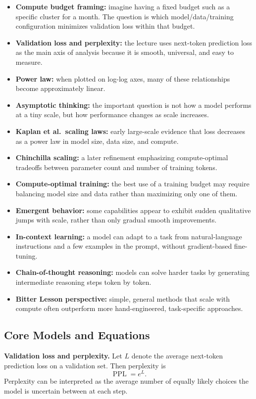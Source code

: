 \documentclass[11pt]{article}
\begin{document}
\begin{itemize}
    \item \textbf{Compute budget framing:} imagine having a fixed budget such as a specific cluster for a month. The question is which model/data/training configuration minimizes validation loss within that budget.
    \item \textbf{Validation loss and perplexity:} the lecture uses next-token prediction loss as the main axis of analysis because it is smooth, universal, and easy to measure.
    \item \textbf{Power law:} when plotted on log-log axes, many of these relationships become approximately linear.
    \item \textbf{Asymptotic thinking:} the important question is not how a model performs at a tiny scale, but how performance changes as scale increases.
    \item \textbf{Kaplan et al.\ scaling laws:} early large-scale evidence that loss decreases as a power law in model size, data size, and compute.
    \item \textbf{Chinchilla scaling:} a later refinement emphasizing compute-optimal tradeoffs between parameter count and number of training tokens.
    \item \textbf{Compute-optimal training:} the best use of a training budget may require balancing model size and data rather than maximizing only one of them.
    \item \textbf{Emergent behavior:} some capabilities appear to exhibit sudden qualitative jumps with scale, rather than only gradual smooth improvements.
    \item \textbf{In-context learning:} a model can adapt to a task from natural-language instructions and a few examples in the prompt, without gradient-based fine-tuning.
    \item \textbf{Chain-of-thought reasoning:} models can solve harder tasks by generating intermediate reasoning steps token by token.
    \item \textbf{Bitter Lesson perspective:} simple, general methods that scale with compute often outperform more hand-engineered, task-specific approaches.
\end{itemize}

\subsection{Core Models and Equations}
\textbf{Validation loss and perplexity.} Let \(L\) denote the average next-token prediction loss on a validation set. Then perplexity is
\[
\operatorname{PPL} = e^{L}.
\]
Perplexity can be interpreted as the average number of equally likely choices the model is uncertain between at each step.
\end{document}
